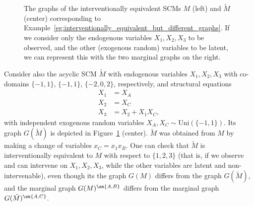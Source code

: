 \begin{Eg}
\begin{figure}
\begin{center}
  \end{center}
  \caption{The graphs of the interventionally equivalent SCMs $M$ (left) and $\tilde{M}$ (center) corresponding to Example~\ref{eg:interventionally_equivalent_but_different_graphs}. If we consider only the endogenous variables $X_1,X_2,X_3$ to be observed, and the other (exogenous random) variables to be latent, we can represent this with the two marginal graphs on the right.\label{fig:interventionally_equivalent_but_different_graphs}}
\end{figure}
Consider also the acyclic SCM $\tilde{M}$ with endogenous variables $X_1,X_2,X_3$ with co-domains $\{-1,1\}$, $\{-1,1\}$, $\{-2,0,2\}$, respectively, and structural equations
$$
  \begin{aligned} 
    X_1 &= X_A \\
    X_2 &= X_C \\
    X_3 &= X_2 + X_1 X_C,
  \end{aligned} 
$$
with independent exogenous random variables $X_A,X_C \sim \mathrm{Uni}(\{-1,1\})$.
Its graph $G(\tilde{M})$ is depicted in Figure~\ref{fig:interventionally_equivalent_but_different_graphs} (center).
$\tilde{M}$ was obtained from $M$ by making a change of variables $x_C = x_1 x_B$.
One can check that $\tilde{M}$ is interventionally equivalent to $M$ with respect to
$\{1,2,3\}$ (that is, if we observe and can intervene on $X_1,X_2,X_3$, while the
other variables are latent and non-intervenable), even though its the graph $G(M)$ differs from the graph $G(\tilde{M})$,
and the marginal graph $G(M)^{\sm \{A,B\}}$ differs from the marginal graph $G(\tilde{M})^{\sm \{A,C\}}$.
\end{Eg}

